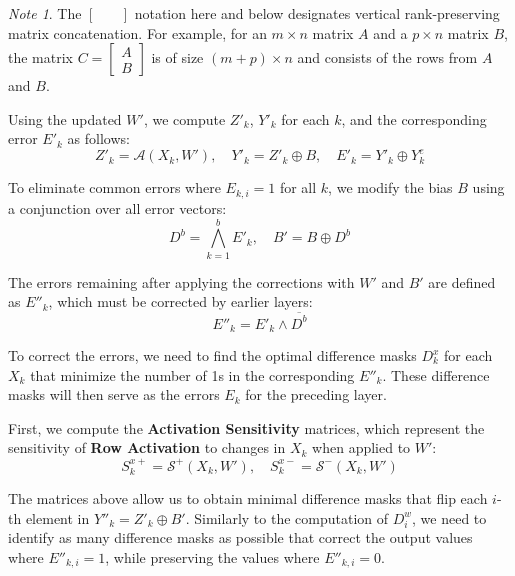 \documentclass{article}
\theoremstyle{definition}
\theoremstyle{remark}
\newtheorem*{note}{Note}
\begin{document}
\begin{note}
    The \(\begin{bmatrix} \quad \end{bmatrix}\) notation here and below designates vertical rank-preserving matrix concatenation. For example, for an \( m \times n \) matrix \( A \) and a \( p \times n \) matrix \( B \), the matrix \( C = \begin{bmatrix} A \\ B \end{bmatrix} \) is of size \( (m+p) \times n \) and consists of the rows from \( A \) and \( B \).
\end{note}

Using the updated \( W' \), we compute \( Z'_k \), \( Y'_k \) for each \( k \), and the corresponding error \( E'_k \) as follows:
\[ Z'_k = \mathcal{A}(X_k, W'), \quad Y'_k = Z'_k \oplus B, \quad E'_k = Y'_k \oplus Y^e_k \]

To eliminate common errors where \( E_{k,i} = 1 \) for all \( k \), we modify the bias \( B \) using a conjunction over all error vectors:
\[ D^b = \bigwedge_{k=1}^b E'_k, \quad B' = B \oplus D^b \]

The errors remaining after applying the corrections with \( W' \) and \( B' \) are defined as \( E''_k \), which must be corrected by earlier layers:
\[ E''_k = E'_k \wedge \overline{D^b} \]

To correct the errors, we need to find the optimal difference masks \( D^x_k \) for each \( X_k \) that minimize the number of 1s in the corresponding \( E''_k \). These difference masks will then serve as the errors \( E_k \) for the preceding layer.

First, we compute the \textbf{Activation Sensitivity} matrices, which represent the sensitivity of \textbf{Row Activation} to changes in \( X_k \) when applied to \( W' \):
\[ S^{x+}_k = \mathcal{S^+}(X_k, W'), \quad S^{x-}_k = \mathcal{S^-}(X_k, W') \]

The matrices above allow us to obtain minimal difference masks that flip each \( i \)-th element in \( Y''_k = Z'_k \oplus B' \). Similarly to the computation of \( D^w_i \), we need to identify as many difference masks as possible that correct the output values where \( E''_{k,i} = 1 \), while preserving the values where \( E''_{k,i} = 0 \).
\end{document}

